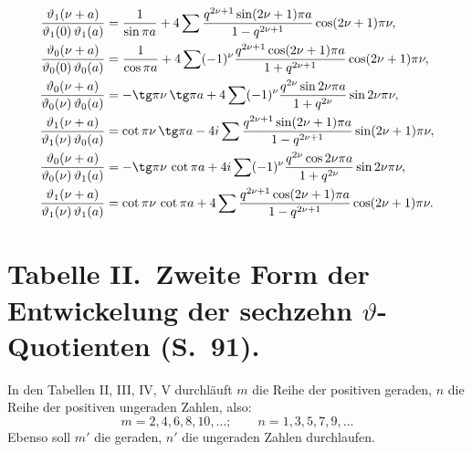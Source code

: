 \documentclass[12pt,a4paper]{article}
\begin{document}
\begin{align*}
\frac{\vartheta_1(\nu+a)}{\vartheta_1(0)\,\vartheta_1(a)} &= \frac{1}{\sin\pi a} + 4\sum \frac{q^{2\nu+1} \sin(2\nu+1)\pi a}{1-q^{2\nu+1}} \cos(2\nu+1)\pi\nu,\\
\frac{\vartheta_0(\nu+a)}{\vartheta_0(0)\,\vartheta_0(a)} &= \frac{1}{\cos\pi a} + 4\sum (-1)^{\nu} \frac{q^{2\nu+1} \cos(2\nu+1)\pi a}{1+q^{2\nu+1}} \cos(2\nu+1)\pi\nu,\\
\frac{\vartheta_0(\nu+a)}{\vartheta_0(\nu)\,\vartheta_0(a)} &= -\tg\pi\nu\,\tg\pi a + 4\sum (-1)^{\nu} \frac{q^{2\nu} \sin 2\nu\pi a}{1+q^{2\nu}} \sin 2\nu\pi\nu,\\
\frac{\vartheta_1(\nu+a)}{\vartheta_1(\nu)\,\vartheta_0(a)} &= \cot\pi\nu\,\tg\pi a - 4i\sum \frac{q^{2\nu+1} \sin(2\nu+1)\pi a}{1-q^{2\nu+1}} \sin(2\nu+1)\pi\nu,\\
\frac{\vartheta_0(\nu+a)}{\vartheta_0(\nu)\,\vartheta_1(a)} &= -\tg\pi\nu\,\cot\pi a + 4i\sum (-1)^{\nu} \frac{q^{2\nu} \cos 2\nu\pi a}{1+q^{2\nu}} \sin 2\nu\pi\nu,\\
\frac{\vartheta_1(\nu+a)}{\vartheta_1(\nu)\,\vartheta_1(a)} &= \cot\pi\nu\,\cot\pi a + 4\sum \frac{q^{2\nu+1} \cos(2\nu+1)\pi a}{1-q^{2\nu+1}} \cos(2\nu+1)\pi\nu.
\end{align*}

\newpage
\section*{Tabelle II.\ Zweite Form der Entwickelung der sechzehn $\vartheta$-Quotienten (S.~91).}

In den Tabellen II, III, IV, V durchläuft $m$ die Reihe der positiven geraden, $n$ die Reihe der positiven ungeraden Zahlen, also:
\[
m = 2, 4, 6, 8, 10, \ldots; \qquad n = 1, 3, 5, 7, 9, \ldots
\]
Ebenso soll $m'$ die geraden, $n'$ die ungeraden Zahlen durchlaufen.
\end{document}
